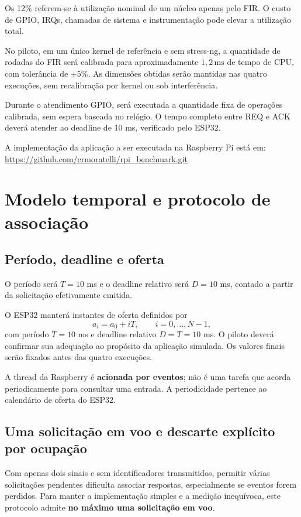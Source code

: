 \documentclass[11pt,a4paper]{article}
\begin{document}
Os 12\% referem-se à utilização nominal de um núcleo apenas pelo FIR. O custo de GPIO, IRQs, chamadas de sistema e instrumentação pode elevar a utilização total.

No piloto, em um único kernel de referência e sem stress-ng, a quantidade de rodadas do FIR será calibrada para aproximadamente $1{,}2\,\mathrm{ms}$ de tempo de CPU, com tolerância de $\pm5\%$.
As dimensões obtidas serão mantidas nas quatro execuções, sem recalibração por kernel ou sob interferência.

Durante o atendimento GPIO, será executada a quantidade fixa de operações calibrada, sem espera baseada no relógio. O tempo completo entre REQ e ACK deverá atender ao deadline de 10 ms, verificado pelo ESP32. 

A implementação da aplicação a ser executada na Raspberry Pi está em: \url{https://github.com/crmoratelli/rpi_benchmark.git}

\section{Modelo temporal e protocolo de associação}

\subsection{Período, deadline e oferta}

O período será $T=10$ ms e o deadline relativo será $D=10$ ms, contado a partir da solicitação efetivamente emitida.


O ESP32 manterá instantes de oferta definidos por
\begin{equation}
 a_i=a_0+iT,\qquad i=0,\ldots,N-1,
\end{equation}
com período $T=10$ ms e deadline relativo $D=T=10$ ms.
O piloto deverá confirmar sua adequação ao propósito da aplicação simulada. Os valores finais serão fixados antes das quatro execuções.

A thread da Raspberry é \textbf{acionada por eventos}; não é uma tarefa que acorda periodicamente para consultar uma entrada. A periodicidade pertence ao calendário de oferta do ESP32.

\subsection{Uma solicitação em voo e descarte explícito por ocupação}

Com apenas dois sinais e sem identificadores transmitidos, permitir várias solicitações pendentes dificulta associar respostas, especialmente se eventos forem perdidos. Para manter a implementação simples e a medição inequívoca, este protocolo admite \textbf{no máximo uma solicitação em voo}.
\end{document}
